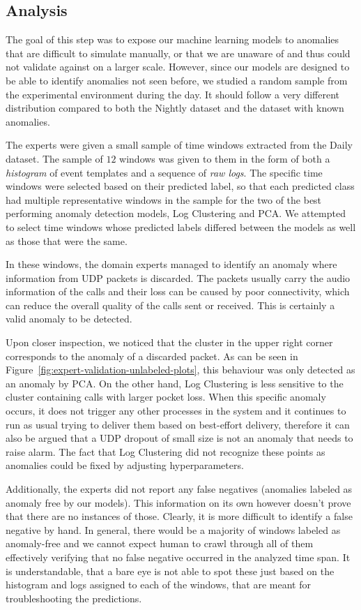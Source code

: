 \subsection{Analysis}
The goal of this step was to expose our machine learning models to anomalies that are difficult to simulate manually, or that we are unaware of and thus could not validate against on a larger scale. However, since our models are designed to be able to identify anomalies not seen before, we studied a random sample from the experimental environment during the day. It should follow a very different distribution compared to both the Nightly dataset and the dataset with known anomalies.

The experts were given a small sample of time windows extracted from the Daily dataset. The sample of $12$ windows was given to them in the form of both a \textit{histogram} of event templates and a sequence of \textit{raw logs}. The specific time windows were selected based on their predicted label, so that each predicted class had multiple representative windows in the sample for the two of the best performing anomaly detection models, Log Clustering and PCA. We attempted to select time windows whose predicted labels differed between the models as well as those that were the same.

In these windows, the domain experts managed to identify an anomaly where information from UDP packets is discarded. The packets usually carry the audio information of the calls and their loss can be caused by poor connectivity, which can reduce the overall quality of the calls sent or received. This is certainly a valid anomaly to be detected. 

Upon closer inspection, we noticed that the cluster in the upper right corner corresponds to the anomaly of a discarded packet. As can be seen in Figure~\ref{fig:expert-validation-unlabeled-plots}, this behaviour was only detected as an anomaly by PCA. On the other hand, Log Clustering is less sensitive to the cluster containing calls with larger pocket loss. When this specific anomaly occurs, it does not trigger any other processes in the system and it continues to run as usual trying to deliver them based on best-effort delivery, therefore it can also be argued that a UDP dropout of small size is not an anomaly that needs to raise alarm. The fact that Log Clustering did not recognize these points as anomalies could be fixed by adjusting hyperparameters.

Additionally, the experts did not report any false negatives (anomalies labeled as anomaly free by our models). This information on its own however doesn't prove that there are no instances of those.
Clearly, it is more difficult to identify a false negative by hand. In general, there would be a majority of windows labeled as anomaly-free and we cannot expect human to crawl through all of them effectively verifying that no false negative occurred in the analyzed time span. It is understandable, that a bare eye is not able to spot these just based on the histogram and logs assigned to each of the windows, that are meant for troubleshooting the predictions.